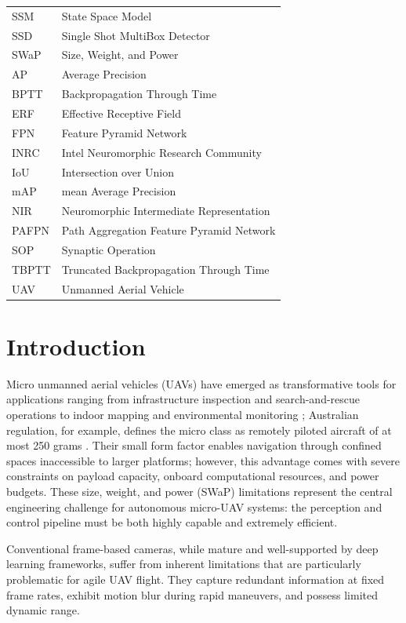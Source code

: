 \documentclass[11pt, a4paper]{report}
\begin{document}
\begin{tabular}{ll}
SSM & State Space Model \\
SSD & Single Shot MultiBox Detector \\
SWaP & Size, Weight, and Power \\
AP & Average Precision \\
BPTT & Backpropagation Through Time \\
ERF & Effective Receptive Field \\
FPN & Feature Pyramid Network \\
INRC & Intel Neuromorphic Research Community \\
IoU & Intersection over Union \\
mAP & mean Average Precision \\
NIR & Neuromorphic Intermediate Representation \\
PAFPN & Path Aggregation Feature Pyramid Network \\
SOP & Synaptic Operation \\
TBPTT & Truncated Backpropagation Through Time \\
UAV & Unmanned Aerial Vehicle \\
\end{tabular}

\chapter{Introduction}
Micro unmanned aerial vehicles (UAVs) have emerged as transformative tools for applications ranging from infrastructure inspection and search-and-rescue operations to indoor mapping and environmental monitoring \cite{floreano2015science}; Australian regulation, for example, defines the micro class as remotely piloted aircraft of at most 250 grams \cite{casa2021part101}. Their small form factor enables navigation through confined spaces inaccessible to larger platforms; however, this advantage comes with severe constraints on payload capacity, onboard computational resources, and power budgets. These size, weight, and power (SWaP) limitations represent the central engineering challenge for autonomous micro-UAV systems: the perception and control pipeline must be both highly capable and extremely efficient.

Conventional frame-based cameras, while mature and well-supported by deep learning frameworks, suffer from inherent limitations that are particularly problematic for agile UAV flight. They capture redundant information at fixed frame rates, exhibit motion blur during rapid maneuvers, and possess limited dynamic range. 
\end{document}
